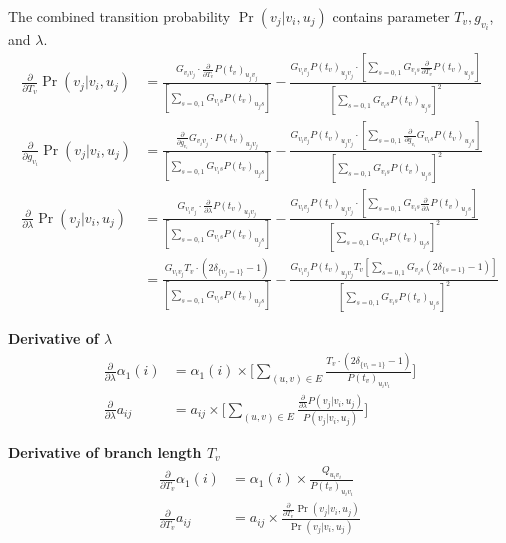 \documentclass[11pt]{article}
\begin{document}
The combined transition probability $\Pr(v_j|v_i,u_j)$  contains parameter $T_v, g_{v_i}$, and $\lambda$.
\begin{equation}
\begin{aligned}
\frac{\partial}{\partial T_v}\Pr(v_j|v_i,u_j)
&=\frac{ G_{v_iv_j}\cdot\frac{\partial}{\partial T_v}P(t_v)_{u_jv_j}} {[\sum\limits_{s=0,1}G_{v_is}P(t_v)_{u_js}]} -
 \frac{G_{v_iv_j}P(t_v)_{u_jv_j}\cdot [\sum\limits_{s=0,1}G_{v_is}\frac{\partial}{\partial T_v}P(t_v)_{u_js}] } {[\sum\limits_{s=0,1}G_{v_is}P(t_v)_{u_js}]^2} \\
\frac{\partial}{\partial g_{v_i}}\Pr(v_j|v_i,u_j)
&=\frac{ \frac{\partial}{\partial g_{v_i}}G_{v_iv_j}\cdot P(t_v)_{u_jv_j}}{[\sum\limits_{s=0,1}G_{v_is}P(t_v)_{u_js}]} -
 \frac{G_{v_iv_j}P(t_v)_{u_jv_j}\cdot [\sum\limits_{s=0,1}\frac{\partial}{\partial g_{v_i}}G_{v_is}P(t_v)_{u_js}] } {[\sum\limits_{s=0,1}G_{v_is}P(t_v)_{u_js}]^2} \\
\frac{\partial}{\partial \lambda}\Pr(v_j|v_i,u_j)
&=\frac{ G_{v_iv_j}\cdot\frac{\partial}{\partial \lambda}P(t_v)_{u_jv_j}} {[\sum\limits_{s=0,1}G_{v_is}P(t_v)_{u_js}]} -
 \frac{G_{v_iv_j}P(t_v)_{u_jv_j}\cdot [\sum\limits_{s=0,1}G_{v_is}\frac{\partial}{\partial \lambda}P(t_v)_{u_js}] } {[\sum\limits_{s=0,1}G_{v_is}P(t_v)_{u_js}]^2} \\
&=\frac{ G_{v_iv_j}T_v\cdot(2\delta_{\{v_j=1\}}-1)} {[\sum\limits_{s=0,1}G_{v_is}P(t_v)_{u_js}]} -
 \frac{G_{v_iv_j}P(t_v)_{u_jv_j}T_v [\sum\limits_{s=0,1}G_{v_is}(2\delta_{\{s=1\}}-1)] } {[\sum\limits_{s=0,1}G_{v_is}P(t_v)_{u_js}]^2}
\end{aligned}
\end{equation}


\noindent\textbf{Derivative of $\lambda$}
\begin{equation*}
\begin{aligned}
\frac{\partial}{\partial\lambda}\alpha_1(i)
&= \alpha_1(i)\times\big[\sum_{(u,v)\in E} \frac{T_v\cdot(2\delta_{\{v_i=1\}}-1)}{P(t_v)_{u_iv_i}} \big] \\
\frac{\partial}{\partial\lambda}a_{ij}
&= a_{ij}\times\big[\sum_{(u,v)\in E}\frac{\frac{\partial}{\partial\lambda}P(v_j|v_i,u_j)}{P(v_j|v_i,u_j)} \big]
\end{aligned}
\end{equation*}

\noindent
\textbf{Derivative of branch length $T_v$}
\begin{equation*}
\begin{aligned}
\frac{\partial}{\partial T_v}\alpha_1(i) &= \alpha_1(i)\times\frac{Q_{u_iv_i}}{P(t_v)_{u_iv_i}} \\
\frac{\partial}{\partial T_v}a_{ij} &=  a_{ij}\times\frac{\frac{\partial}{\partial T_v}\Pr(v_j|v_i,u_j) }{\Pr(v_j|v_i,u_j)}
\end{aligned}
\end{equation*}
\end{document}
